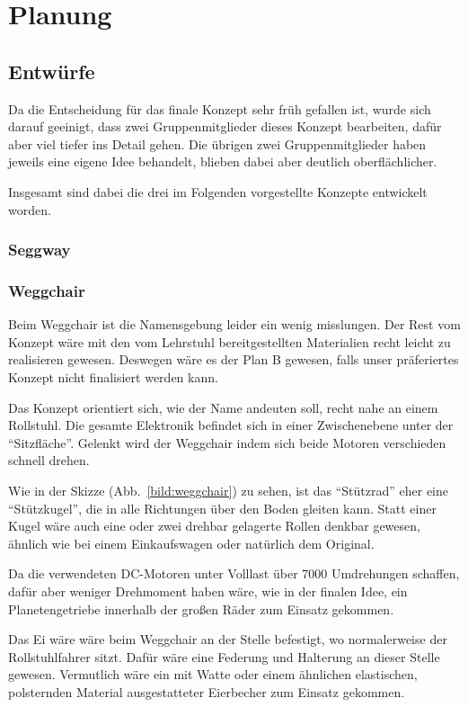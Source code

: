 \chapter{Planung}
\section{Entwürfe}
Da die Entscheidung für das finale Konzept sehr früh gefallen ist, wurde sich darauf geeinigt, dass zwei Gruppenmitglieder dieses Konzept bearbeiten, dafür aber viel tiefer ins Detail gehen. 
Die übrigen zwei Gruppenmitglieder haben jeweils eine eigene Idee behandelt, blieben dabei aber deutlich oberflächlicher. 

Insgesamt sind dabei die drei im Folgenden vorgestellte Konzepte entwickelt worden.

\subsection{Seggway}

\subsection{Weggchair}
Beim Weggchair ist die Namensgebung leider ein wenig misslungen. 
Der Rest vom Konzept wäre mit den vom Lehrstuhl bereitgestellten Materialien recht leicht zu realisieren gewesen.
Deswegen wäre es der Plan B gewesen, falls unser präferiertes Konzept nicht finalisiert werden kann. 

Das Konzept orientiert sich, wie der Name andeuten soll, recht nahe an einem Rollstuhl. 
Die gesamte Elektronik befindet sich in einer Zwischenebene unter der ``Sitzfläche''. 
Gelenkt wird der Weggchair indem sich beide Motoren verschieden schnell drehen. 

Wie in der Skizze (Abb.~\ref{bild:weggchair}) zu sehen, ist das ``Stützrad'' eher eine ``Stützkugel'', die in alle Richtungen über den Boden gleiten kann. 
Statt einer Kugel wäre auch eine oder zwei drehbar gelagerte Rollen denkbar gewesen, ähnlich wie bei einem Einkaufswagen oder natürlich dem Original. 

Da die verwendeten DC-Motoren unter Volllast über 7000 Umdrehungen schaffen, dafür aber weniger Drehmoment haben wäre, wie in der finalen Idee, ein Planetengetriebe innerhalb der großen Räder zum Einsatz gekommen. 

Das Ei wäre wäre beim Weggchair an der Stelle befestigt, wo normalerweise der Rollstuhlfahrer sitzt. Dafür wäre eine Federung und Halterung an dieser Stelle gewesen. Vermutlich wäre ein mit Watte oder einem ähnlichen elastischen, polsternden Material ausgestatteter Eierbecher zum Einsatz gekommen.


